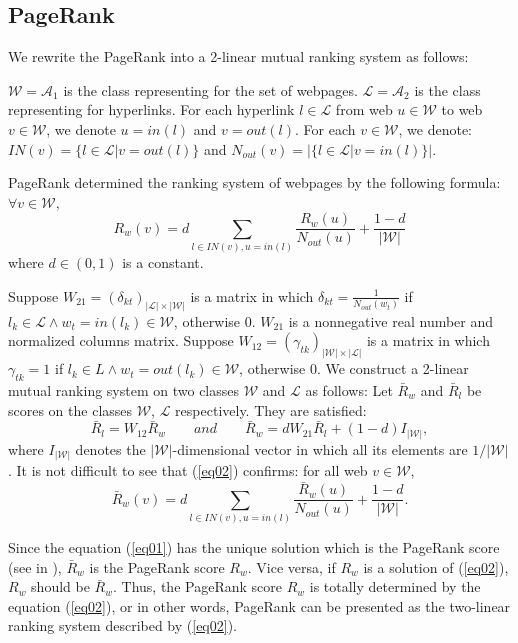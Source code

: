 \documentclass[lnicst]{svmultln}
\begin{document}
\subsection{PageRank}\label{Sect:PageRank}
We rewrite the PageRank into a 2-linear mutual ranking system as follows:

$\mathcal{W}= \mathcal{A}_1$ is the class representing for the set of webpages. $\mathcal{L}= \mathcal{A}_2$ is the class representing for hyperlinks. For each hyperlink $l\in \mathcal{L}$ from web $u\in \mathcal{W}$ to web $v \in \mathcal{W}$, we denote $u=in(l)$ and $v=out(l)$. For each $v \in \mathcal{W}$, we denote: $IN(v)=\{l \in \mathcal{L}|  v=out(l)\}$ and $N_{out}(v)=|\{ l\in \mathcal{L}| v=in(l)\}|$.
\setlength{\parskip}{6pt}

PageRank\cite{pagerank98} determined the ranking system of webpages by the following formula: $\forall v\in\mathcal{W}$,
\begin{equation}\label{eq01}
R_w(v) = d\sum_{l \in IN(v), u=in(l)} \frac{R_w(u)}{N_{out}(u)} + \frac{1-d}{|\mathcal{W}|}
\end{equation}
where $d\in (0,1)$ is a constant.
\setlength{\parskip}{6pt}

Suppose  $W_{21} = (\delta_{kt}) _{|\mathcal{L}|\times |\mathcal{W}|}$ is a matrix in which $\delta_{kt} = \frac{1}{N_{out}(w_t)}$ if $l_k\in \mathcal{L} \wedge w_t= in (l_k)\in \mathcal{W}$, otherwise 0. $W_{21}$ is a nonnegative real number and normalized columns matrix. Suppose  $W_{12} = (\gamma_{tk}) _{|\mathcal{W}|\times |\mathcal{L}|}$ is a matrix in which $\gamma_{tk} = 1$ if $l_k\in L \wedge w_t= out (l_k)\in \mathcal{W}$, otherwise 0. We construct a 2-linear mutual ranking system on two classes $\mathcal{W}$ and $\mathcal{L}$ as follows: Let $\bar{R}_w$ and $\bar{R}_l$ be scores on the classes $\mathcal{W}$, $\mathcal{L}$ respectively. They are satisfied:
\begin{equation}\label{eq02}
\bar{R}_l = W_{12}\bar{R}_w\qquad and \qquad
\bar{R}_w = dW_{21}\bar{R}_l + (1-d)I_{|\mathcal{W}|},
\end{equation}
where $I_{|\mathcal{W}|}$ denotes the $|\mathcal{W}|$-dimensional vector in which all its elements are $1/|\mathcal{W}|$. It is not difficult to see that (\ref{eq02}) confirms: for all web $v\in\mathcal{W}$,
\[\bar{R}_w(v) = d\sum_{l \in IN(v), u=in(l)} \frac{\bar{R}_w(u)}{N_{out}(u)} + \frac{1-d}{|\mathcal{W}|}.\]

Since the equation (\ref{eq01}) has the unique solution which is the PageRank score (see in \cite{pagerank98}), $\bar{R}_w$ is the PageRank score $R_w$. Vice versa, if $R_w$ is a solution of (\ref{eq02}), $R_w$ should be $\bar{R}_w$. Thus, the PageRank score $R_w$ is totally determined by the equation (\ref{eq02}), or in other words, PageRank can be presented as the two-linear ranking system described by (\ref{eq02}).
\setlength{\parskip}{6pt}
\end{document}
